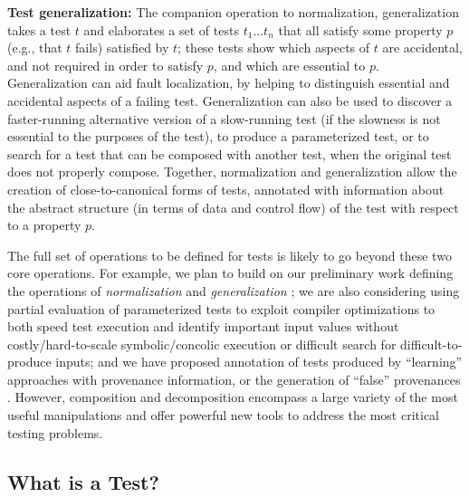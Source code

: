 \begin{enumerate}
{\item {\bf Test generalization:} The companion operation to
  normalization, generalization takes a test $t$ and elaborates a set
  of tests $t_1 \ldots t_n$ that all satisfy some property $p$ (e.g.,
  that $t$ fails) satisfied by $t$; these tests show which aspects of
  $t$ are accidental, and not required in order to satisfy $p$, and
  which are essential to $p$.  Generalization can aid fault
  localization, by helping to distinguish essential and accidental
  aspects of a failing test.  Generalization can also be used to
  discover a faster-running alternative version of a slow-running test
  (if the slowness is not essential to the purposes of the test), to
  produce a parameterized test, or to search for a test that can be
  composed with another test, when the original test does not properly
  compose.  Together, normalization and generalization allow the
  creation of close-to-canonical forms of tests, annotated with
  information about the abstract structure (in terms of data and
  control flow) of the test with respect to a property $p$.}
\end{enumerate}


The full set of operations to be defined for tests is likely to
go beyond these two core operations.  For example, we plan to build on
our preliminary work defining the operations of \emph{normalization}
and \emph{generalization} \cite{OneTest}; we are also considering
using partial evaluation of parameterized tests to exploit compiler
optimizations to both speed test execution and identify important
input values without costly/hard-to-scale symbolic/concolic
execution \cite{GodefroidKS05,KLEE} or
difficult search for difficult-to-produce inputs; and we have proposed
annotation of tests produced by ``learning'' approaches with
provenance information, or the generation of ``false'' provenances
\cite{seededprovenance}.  However, 
composition and decomposition encompass a large variety of the most useful
manipulations and offer powerful new tools to address the most critical testing problems.


\subsection{What is a Test?}
\label{sec:principles}



